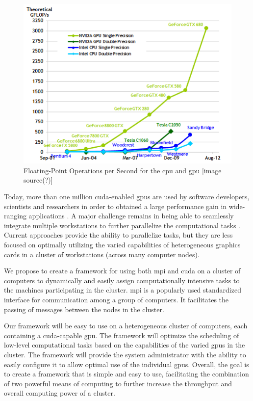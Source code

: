 \begin{figure}[htb]
\centering
\includegraphics[scale=0.75]{img/floatingPoint.png}
\caption{Floating-Point Operations per Second for the \gls{cpu} and
         \gls{gpu} [image source(?)]}
\end{figure}

Today, more than one million \gls{cuda}-enabled \glspl{gpu} are used by
software developers, scientists and researchers in order to obtained a large
performance gain in wide-ranging applications
\cite{website:cudaCProgrammingGuide}. A major challenge remains in being
able to seamlessly integrate multiple workstations to further parallelize the
computational tasks \cite{hadri2010identifying} \cite{hindman2009common}.
Current approaches provide the ability to parallelize tasks, but they are less
focused on optimally utilizing the varied capabilities of heterogeneous
graphics cards in a cluster of workstations (across many computer nodes).

We propose to create a framework for using both \Gls{mpi} and \gls{cuda} on a
cluster of computers to dynamically and easily assign computationally intensive
tasks to the machines participating in the cluster.  \Gls{mpi} is a popularly
used standardized interface for communication among a group of computers. It
facilitates the passing of messages between the nodes in the cluster.

Our framework will be easy to use on a heterogeneous cluster of computers, each
containing a \Gls{cuda}-capable \gls{gpu}\@. The framework will optimize the
scheduling of low-level computational tasks based on the capabilities of the
varied \glspl{gpu} in the cluster. The framework will provide the system
administrator with the ability to easily configure it to allow optimal use of
the individual \glspl{gpu}. Overall, the goal is to create a framework that is
simple and easy to use, facilitating the combination of two powerful means of
computing to further increase the throughput and overall computing power of a
cluster.

